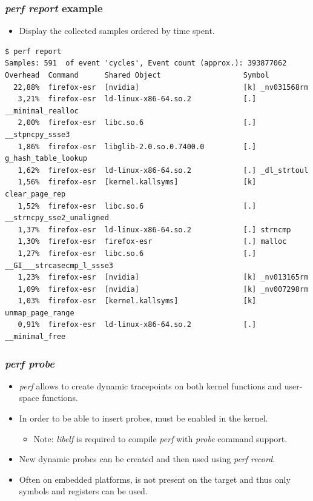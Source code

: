 \begin{frame}[fragile]
  \frametitle{{\em perf report} example}
  \begin{itemize}
    \item Display the collected samples ordered by time spent.
  \end{itemize}
  \begin{block}{}
    \begin{verbatim}
$ perf report
Samples: 591  of event 'cycles', Event count (approx.): 393877062
Overhead  Command      Shared Object                   Symbol
  22,88%  firefox-esr  [nvidia]                        [k] _nv031568rm
   3,21%  firefox-esr  ld-linux-x86-64.so.2            [.] __minimal_realloc
   2,00%  firefox-esr  libc.so.6                       [.] __stpncpy_ssse3
   1,86%  firefox-esr  libglib-2.0.so.0.7400.0         [.] g_hash_table_lookup
   1,62%  firefox-esr  ld-linux-x86-64.so.2            [.] _dl_strtoul
   1,56%  firefox-esr  [kernel.kallsyms]               [k] clear_page_rep
   1,52%  firefox-esr  libc.so.6                       [.] __strncpy_sse2_unaligned
   1,37%  firefox-esr  ld-linux-x86-64.so.2            [.] strncmp
   1,30%  firefox-esr  firefox-esr                     [.] malloc
   1,27%  firefox-esr  libc.so.6                       [.] __GI___strcasecmp_l_ssse3
   1,23%  firefox-esr  [nvidia]                        [k] _nv013165rm
   1,09%  firefox-esr  [nvidia]                        [k] _nv007298rm
   1,03%  firefox-esr  [kernel.kallsyms]               [k] unmap_page_range
   0,91%  firefox-esr  ld-linux-x86-64.so.2            [.] __minimal_free
    \end{verbatim}
  \end{block}
\end{frame}

\begin{frame}
  \frametitle{{\em perf probe}}
  \begin{itemize}
    \item {\em perf} allows to create dynamic tracepoints on both kernel functions and
          user-space functions.
    \item In order to be able to insert probes,  must be
          enabled in the kernel.
    \begin{itemize}
      \item Note: {\em libelf} is required to compile {\em perf} with
            {\em probe} command support.
    \end{itemize}
    \item New dynamic probes can be created and then used using
          {\em perf record}.
    \item Often on embedded platforms,  is not present on the
          target and thus only symbols and registers can be used.
  \end{itemize}
\end{frame}

